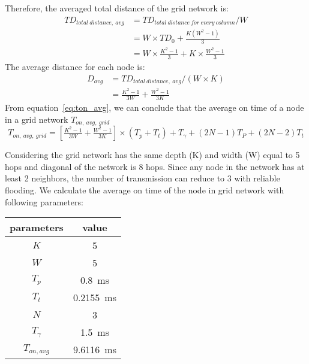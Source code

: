 Therefore, the averaged total distance of the grid network is:
\begin{align}
	TD_{total\ distance,\ avg}	&= TD_{total\ distance\ for\ every\ column}/W\\
	&= W\times TD_0 + \tfrac{K(W^2-1)}{3}\\
	&= W\times\tfrac{K^2-1}{3} + K\times\tfrac{W^2-1}{3}
\end{align}
The average distance for each node is:
\begin{align}
	D_{avg} &= TD_{total\ distance,\ avg}/(W\times K)\\
	&= \tfrac{K^2-1}{3W} + \tfrac{W^2-1}{3K}
\end{align}
From equation~\ref{eq:ton_avg}, we can conclude that the average on time of a node in a grid
network $T_{on,\ avg,\ grid}$ 
\begin{equation}
	T_{on,\ avg,\ grid} = {[\tfrac{K^2-1}{3W} + \tfrac{W^2-1}{3K}]\times(T_p + T_t)} + {T_\gamma + (2N-1)T_P + (2N-2)T_t}
\end{equation}

Considering the grid network has the same depth (K) and width (W) equal to 5 hops and diagonal of the
network is 8 hops. Since any node in the network has at least 2 neighbors, the number of transmission
can reduce to 3 with reliable flooding. We calculate the average on time of the node in grid network
with following parameters:
\begin{table}[h]
\centering
	\begin{tabular}{|c|c|}
	\hline
	{\bf parameters} & {\bf value}\\ \hline
	$K$ 	& 5\\ \hline
	$W$		& 5\\ \hline
	$T_p$ 	& 0.8~ms\\ \hline
	$T_t$	& 0.2155~ms\\ \hline
	$N$		& 3\\ \hline
	$T_\gamma$& 1.5~ms\\ \hline\hline
	$T_{on, avg}$& 9.6116~ms\\ \hline
	\end{tabular}
\end{table}
